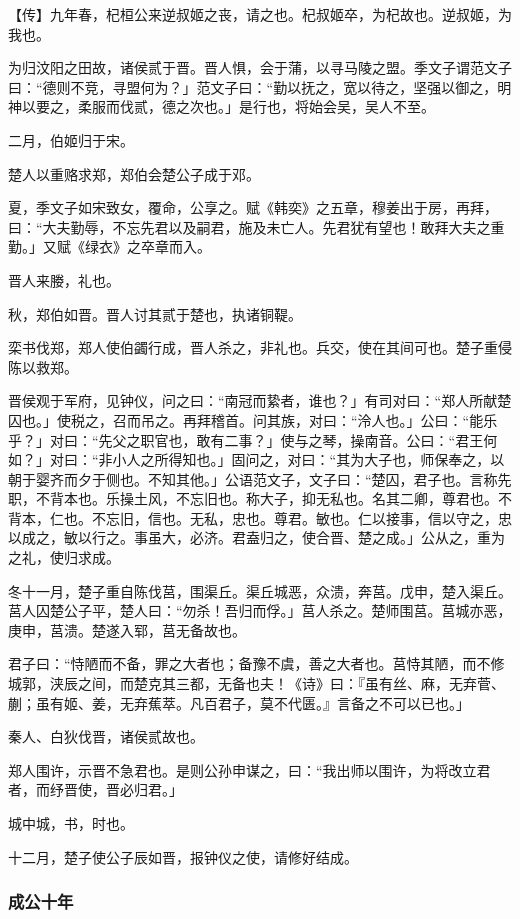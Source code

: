 \documentclass[]{article}
\begin{document}
【传】九年春，杞桓公来逆叔姬之丧，请之也。杞叔姬卒，为杞故也。逆叔姬，为我也。

为归汶阳之田故，诸侯贰于晋。晋人惧，会于蒲，以寻马陵之盟。季文子谓范文子曰：``德则不竞，寻盟何为？」范文子曰：``勤以抚之，宽以待之，坚强以御之，明神以要之，柔服而伐贰，德之次也。」是行也，将始会吴，吴人不至。

二月，伯姬归于宋。

楚人以重赂求郑，郑伯会楚公子成于邓。

夏，季文子如宋致女，覆命，公享之。赋《韩奕》之五章，穆姜出于房，再拜，曰：``大夫勤辱，不忘先君以及嗣君，施及未亡人。先君犹有望也！敢拜大夫之重勤。」又赋《绿衣》之卒章而入。

晋人来媵，礼也。

秋，郑伯如晋。晋人讨其贰于楚也，执诸铜鞮。

栾书伐郑，郑人使伯蠲行成，晋人杀之，非礼也。兵交，使在其间可也。楚子重侵陈以救郑。

晋侯观于军府，见钟仪，问之曰：``南冠而絷者，谁也？」有司对曰：``郑人所献楚囚也。」使税之，召而吊之。再拜稽首。问其族，对曰：``泠人也。」公曰：``能乐乎？」对曰：``先父之职官也，敢有二事？」使与之琴，操南音。公曰：``君王何如？」对曰：``非小人之所得知也。」固问之，对曰：``其为大子也，师保奉之，以朝于婴齐而夕于侧也。不知其他。」公语范文子，文子曰：``楚囚，君子也。言称先职，不背本也。乐操土风，不忘旧也。称大子，抑无私也。名其二卿，尊君也。不背本，仁也。不忘旧，信也。无私，忠也。尊君。敏也。仁以接事，信以守之，忠以成之，敏以行之。事虽大，必济。君盍归之，使合晋、楚之成。」公从之，重为之礼，使归求成。

冬十一月，楚子重自陈伐莒，围渠丘。渠丘城恶，众溃，奔莒。戊申，楚入渠丘。莒人囚楚公子平，楚人曰：``勿杀！吾归而俘。」莒人杀之。楚师围莒。莒城亦恶，庚申，莒溃。楚遂入郓，莒无备故也。

君子曰：``恃陋而不备，罪之大者也；备豫不虞，善之大者也。莒恃其陋，而不修城郭，浃辰之间，而楚克其三都，无备也夫！《诗》曰：『虽有丝、麻，无弃菅、蒯；虽有姬、姜，无弃蕉萃。凡百君子，莫不代匮。』言备之不可以已也。」

秦人、白狄伐晋，诸侯贰故也。

郑人围许，示晋不急君也。是则公孙申谋之，曰：``我出师以围许，为将改立君者，而纾晋使，晋必归君。」

城中城，书，时也。

十二月，楚子使公子辰如晋，报钟仪之使，请修好结成。

\hypertarget{header-n1659}{%
\subsubsection{成公十年}\label{header-n1659}}
\end{document}
